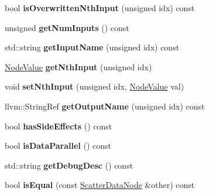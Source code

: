 \begin{DoxyCompactItemize}
bool {\bfseries is\+Overwritten\+Nth\+Input} (unsigned idx) const
\item 
\mbox{\label{classglow_1_1_scatter_data_node_ae6491d37fe39e7a2e244d652c8ca9011}} 
unsigned {\bfseries get\+Num\+Inputs} () const
\item 
\mbox{\label{classglow_1_1_scatter_data_node_acaf06179cb99d0baef4bd808fdb215da}} 
std\+::string {\bfseries get\+Input\+Name} (unsigned idx) const
\item 
\mbox{\label{classglow_1_1_scatter_data_node_a616006607e7383b5021461ef43664c6b}} 
\hyperlink{structglow_1_1_node_value}{Node\+Value} {\bfseries get\+Nth\+Input} (unsigned idx)
\item 
\mbox{\label{classglow_1_1_scatter_data_node_ac3e4f48f570d24d20d2e675c223e4326}} 
void {\bfseries set\+Nth\+Input} (unsigned idx, \hyperlink{structglow_1_1_node_value}{Node\+Value} val)
\item 
\mbox{\label{classglow_1_1_scatter_data_node_adb85801b52f99a47fd158feb26108717}} 
llvm\+::\+String\+Ref {\bfseries get\+Output\+Name} (unsigned idx) const
\item 
\mbox{\label{classglow_1_1_scatter_data_node_ae8d776761e5a0dbaab4e57e489abdcdc}} 
bool {\bfseries has\+Side\+Effects} () const
\item 
\mbox{\label{classglow_1_1_scatter_data_node_a6911f02f79c7f84005c76013ed760308}} 
bool {\bfseries is\+Data\+Parallel} () const
\item 
\mbox{\label{classglow_1_1_scatter_data_node_aa6a7ce5c2ed9cffd40caf26f1e429ef6}} 
std\+::string {\bfseries get\+Debug\+Desc} () const
\item 
\mbox{\label{classglow_1_1_scatter_data_node_adb4b8d58d43ec41fb9de02a6195f5810}} 
bool {\bfseries is\+Equal} (const \hyperlink{classglow_1_1_scatter_data_node}{Scatter\+Data\+Node} \&other) const
\item 

\end{DoxyCompactItemize}
